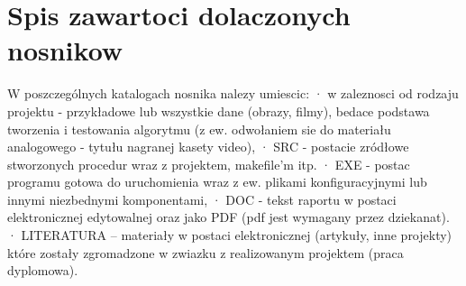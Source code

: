 \chapter{Spis zawartoci dolaczonych nosnikow}

W poszczególnych katalogach nosnika nalezy umiescic:
·  w zaleznosci od rodzaju projektu - przykładowe lub wszystkie dane (obrazy, filmy), bedace podstawa tworzenia i testowania algorytmu (z ew. odwołaniem sie do materiału analogowego - tytułu nagranej kasety video),
·  SRC - postacie zródłowe stworzonych procedur wraz z projektem, makefile’m itp.
·  EXE - postac programu gotowa do uruchomienia wraz z ew. plikami konfiguracyjnymi lub
innymi niezbednymi komponentami,
·  DOC - tekst raportu w postaci elektronicznej edytowalnej oraz jako PDF (pdf jest
wymagany przez dziekanat).
·  LITERATURA – materiały w postaci elektronicznej (artykuły, inne projekty) które zostały
zgromadzone w zwiazku z realizowanym projektem (praca dyplomowa).